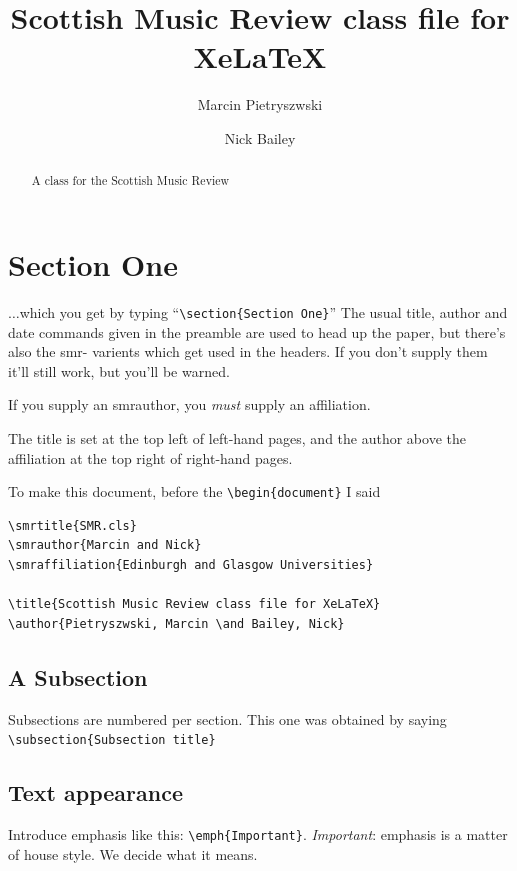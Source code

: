 \documentclass{SMR}
\title{Scottish Music Review class file for XeLaTeX}
\author{Marcin Pietryszwski \and Nick Bailey}
\begin{document}
\newcommand{\cmd}[1]{\texttt{\textbackslash #1}}

\maketitle

\begin{abstract}
A class for the Scottish Music Review
\end{abstract}

\section{Section One} %

$\ldots$which you get by typing ``\cmd{section\{Section One\}}''
The usual title, author and date commands given in the preamble
are used to head up the paper, but there's also the smr- varients
which get used in the headers. 
If you don't supply them it'll still work, but you'll be warned.

If you supply an smrauthor, you \emph{must} supply an affiliation.

The title is set at the top left of left-hand pages, and the
author above the affiliation at the top right of right-hand pages.

To make this document, before
the \cmd{begin\{document\}} I said

\begin{verbatim}
\smrtitle{SMR.cls}
\smrauthor{Marcin and Nick}
\smraffiliation{Edinburgh and Glasgow Universities}

\title{Scottish Music Review class file for XeLaTeX}
\author{Pietryszwski, Marcin \and Bailey, Nick}
\end{verbatim}

\subsection{A Subsection} %

Subsections are numbered per section. This one was obtained by saying
\cmd{subsection\{Subsection title\}}

\subsection{Text appearance}
Introduce emphasis like this: \cmd{emph\{Important\}}.
\emph{Important}: emphasis is a matter of house style.
We decide what it means.
\end{document}
